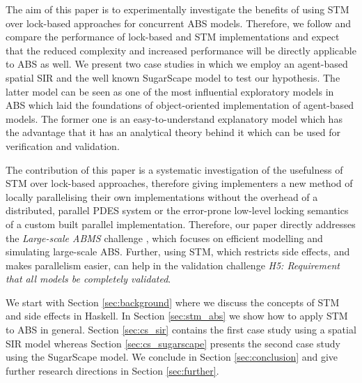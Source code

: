 \medskip

The aim of this paper is to experimentally investigate the benefits of using STM over lock-based approaches for concurrent ABS models. Therefore, we follow \cite{discolo_lock_2006} and compare the performance of lock-based and STM implementations and expect that the reduced complexity and increased performance will be directly applicable to ABS as well. We present two case studies in which we employ an agent-based spatial SIR \cite{macal_agent-based_2010, thaler_pure_2018} and the well known SugarScape \cite{epstein_growing_1996} model to test our hypothesis. The latter model can be seen as one of the most influential exploratory models in ABS which laid the foundations of object-oriented implementation of agent-based models. The former one is an easy-to-understand explanatory model which has the advantage that it has an analytical theory behind it which can be used for verification and validation. 

The contribution of this paper is a systematic investigation of the usefulness of STM over lock-based approaches, therefore giving implementers a new method of locally parallelising their own implementations without the overhead of a distributed, parallel PDES system or the error-prone low-level locking semantics of a custom built parallel implementation. Therefore, our paper directly addresses the \textit{Large-scale ABMS} challenge \cite{macal_everything_2016}, which focuses on efficient modelling and simulating large-scale ABS. Further, using STM, which restricts side effects, and makes parallelism easier, can help in the validation challenge \cite{macal_everything_2016} \emph{H5: Requirement that all models be completely validated}.

We start with Section \ref{sec:background} where we discuss the concepts of STM and side effects in Haskell. In Section \ref{sec:stm_abs} we show how to apply STM to ABS in general. Section \ref{sec:cs_sir} contains the first case study using a spatial SIR model whereas Section \ref{sec:cs_sugarscape} presents the second case study using the SugarScape model. We conclude in Section \ref{sec:conclusion} and give further research directions in Section \ref{sec:further}.